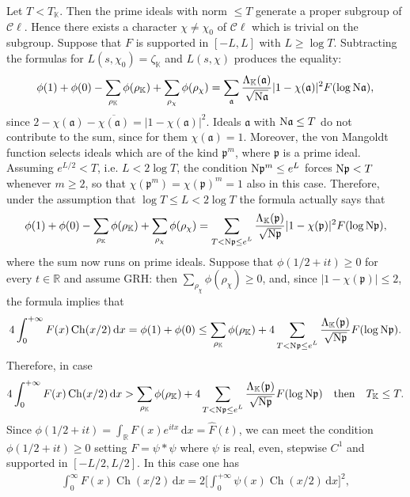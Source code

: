 \documentclass[a4paper,11pt]{amsart}
\newcommand{\field}[1]{\mathbb{{#1}}}
\newcommand{\ideal}[1]{\mathfrak{{#1}}}
\newcommand{\R}{\field{R}}
\newcommand{\K}{\field{{K}}}
\newcommand{\p}{\ideal{p}}
\renewcommand{\a}{\ideal{a}}
\newcommand{\Norm}{\textrm{\upshape N}}
\newcommand{\Cl}{\mathcal C\!\ell}
\newcommand{\dd}{\,\mathrm{d}}
\DeclareMathOperator{\Ch}{Ch}
\theoremstyle{remark}
\begin{document}
Let $T < T_\K$. Then the prime ideals with norm $\leq T$ generate a proper subgroup of $\Cl$. Hence there
exists a character $\chi\neq \chi_0$ of $\Cl$ which is trivial on the subgroup. Suppose that $F$ is
supported in $[-L,L]$ with $L \geq \log T$. Subtracting the formulas for $L(s,\chi_0)=\zeta_\K$ and
$L(s,\chi)$ produces the equality:
\[
\phi(1) + \phi(0) - \sum_{\rho_\K} \phi(\rho_\K) + \sum_{\rho_\chi} \phi(\rho_\chi)
= \sum_{\a} \frac{\Lambda_{\K}(\a)}{\sqrt{\Norm\a}}|1-\chi(\a)|^2 F(\log \Norm\a),
\]
since $2-\chi(\a)-\overline{\chi(\a)}=|1-\chi(\a)|^2$. Ideals $\a$ with $\Norm\a \leq T$ do not
contribute to the sum, since for them $\chi(\a)=1$. Moreover, the von Mangoldt function selects ideals
which are of the kind $\p^m$, where $\p$ is a prime ideal. Assuming $e^{L/2} < T$, i.e. $L<2\log T$, the
condition $\Norm\p^m \leq e^L$ forces $\Norm\p < T$ whenever $m\geq 2$, so that $\chi(\p^m)=\chi(\p)^m=1$
also in this case. Therefore, under the assumption that $\log T\leq L < 2\log T$ the formula actually
says that
\begin{equation}\label{eq:4A}
\phi(1) + \phi(0) - \sum_{\rho_\K} \phi(\rho_\K) + \sum_{\rho_\chi} \phi(\rho_\chi)
= \sum_{\substack{T< \Norm\p \leq e^L}} \frac{\Lambda_{\K}(\p)}{\sqrt{\Norm\p}}|1-\chi(\p)|^2 F(\log \Norm\p),
\end{equation}
where the sum now runs on prime ideals. Suppose that $\phi(1/2+it)\geq 0$ for every $t\in\R$ and assume
GRH: then $\sum_{\rho_\chi} \phi(\rho_\chi) \geq 0$, and, since $|1-\chi(\p)|\leq 2$, the formula implies
that
\begin{equation}\label{eq:5A}
4\int_0^{+\infty}F(x)\Ch(x/2)\dd x
 =    \phi(1) + \phi(0)
 \leq \sum_{\rho_\K} \phi(\rho_\K)
    + 4\sum_{\substack{T< \Norm\p \leq e^L}} \frac{\Lambda_{\K}(\p)}{\sqrt{\Norm\p}} F(\log \Norm\p).
\end{equation}
Therefore, in case
\begin{equation}\label{eq:6A}
4\int_0^{+\infty}F(x)\Ch(x/2)\dd x
> \sum_{\rho_\K} \phi(\rho_\K)
    + 4\sum_{\substack{T< \Norm\p \leq e^L}} \frac{\Lambda_{\K}(\p)}{\sqrt{\Norm\p}} F(\log \Norm\p)
\quad \text{then} \quad T_\K \leq T.
\end{equation}
%
Since $\phi(1/2+it) = \int_\R F(x)e^{itx}\dd x = \hat{F}(t)$, we can meet the condition $\phi(1/2+it)\geq
0$ setting $F= \psi\ast\psi$ where $\psi$ is real, even, stepwise $C^1$ and supported in $[-L/2,L/2]$.
%
In this case one has
\begin{align*}
\int_0^{\infty}F(x)\Ch(x/2)\dd x
=2 \Big[\int_{0}^{+\infty}\psi(x)\Ch(x/2)\dd x\Big]^2,
\end{align*}
\end{document}

